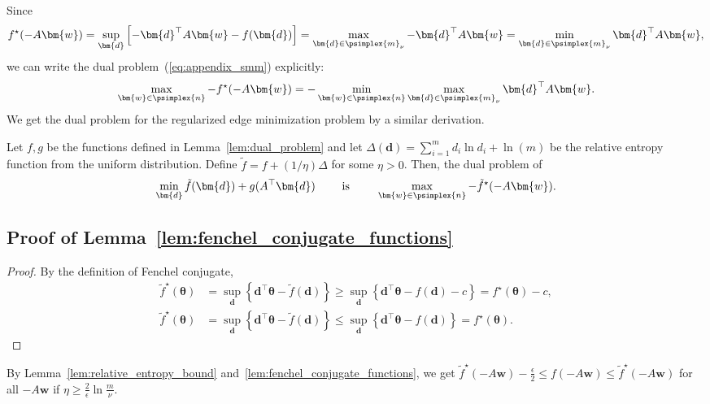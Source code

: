 Since 
\begin{align*}
    f^\star(-A\bm{w}) 
    = \sup_{\bm{d}} \left[ - \bm{d}^\top A \bm{w} - f(\bm{d}) \right]
    = \max_{\bm{d} \in \psimplex{m}_{\nu}} - \bm{d}^\top A \bm{w}
    = \min_{\bm{d} \in \psimplex{m}_{\nu}} \bm{d}^\top A \bm{w},
\end{align*}
we can write the dual problem~(\ref{eq:appendix_smm}) explicitly:
\begin{align*}
    \max_{\bm{w} \in \psimplex{n}} - f^\star ( -A \bm{w} )
        = - \min_{\bm{w} \in \psimplex{n}}
            \max_{\bm{d} \in \psimplex{m}_{\nu}}
        \bm{d}^\top A \bm{w}.
\end{align*}
We get the dual problem for the regularized edge minimization problem 
by a similar derivation. 
\begin{cor.}
    \label{lem:smoothed_dual_problem}
    Let $f, g$ be the functions defined in Lemma~\ref{lem:dual_problem} and 
    let $\Delta(\bm{d}) = \sum_{i=1}^m d_i \ln d_i + \ln(m)$ be 
    the relative entropy function from the uniform distribution. 
    Define $\tilde{f} = f + (1/\eta) \Delta$ for some $\eta > 0$. 
    Then, the dual problem of 
    \begin{align}
        \nonumber
        \min_{\bm{d}} \tilde{f}(\bm{d}) + g(A^\top \bm{d})
        \qquad \text{ is } \qquad
        \max_{\bm{w} \in \psimplex{n}} - \tilde{f}^\star(-A \bm{w}).
    \end{align}
\end{cor.}

\subsection{Proof of Lemma~\ref{lem:fenchel_conjugate_functions}}
\begin{proof}
    By the definition of Fenchel conjugate, 
    \begin{align*}
        \tilde{f}^\star(\bm{\theta})
        & = \sup_{\bm{d}} \left\{
            \bm{d}^\top \bm{\theta} - \tilde{f}(\bm{d})
        \right\}
        \geq \sup_{\bm{d}} \left\{
            \bm{d}^\top \bm{\theta} - f(\bm{d}) - c
        \right\}
        = f^\star(\bm{\theta}) - c, \\
        \tilde{f}^\star(\bm{\theta})
        & = \sup_{\bm{d}} \left\{
            \bm{d}^\top \bm{\theta} - \tilde{f}(\bm{d})
        \right\}
        \leq \sup_{\bm{d}} \left\{
            \bm{d}^\top \bm{\theta} - f(\bm{d})
        \right\}
        = f^\star(\bm{\theta}).
    \end{align*}
\end{proof}
By Lemma~\ref{lem:relative_entropy_bound} 
and~\ref{lem:fenchel_conjugate_functions}, 
we get 
$
    \tilde{f}^\star (-A\bm{w}) - \frac{\epsilon}{2}
    \leq f(-A\bm{w}) \leq \tilde{f}^\star(-A\bm{w})
$ for all $-A \bm{w}$ 
if $\eta \geq \frac{2}{\epsilon} \ln \frac{m}{\nu}$. 


